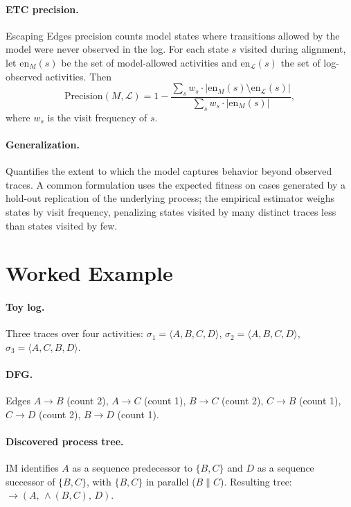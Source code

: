 \paragraph{ETC precision.} Escaping Edges precision counts model states
where transitions allowed by the model were never observed in the log.
For each state $s$ visited during alignment, let $\mathrm{en}_M(s)$ be the
set of model-allowed activities and $\mathrm{en}_{\mathcal{L}}(s)$ the
set of log-observed activities. Then
\begin{equation}
\mathrm{Precision}(M, \mathcal{L}) = 1 - \frac{\sum_s w_s \cdot
|\mathrm{en}_M(s) \setminus \mathrm{en}_{\mathcal{L}}(s)|}
{\sum_s w_s \cdot |\mathrm{en}_M(s)|},
\end{equation}
where $w_s$ is the visit frequency of $s$.

\paragraph{Generalization.} Quantifies the extent to which the model
captures behavior beyond observed traces. A common formulation uses the
expected fitness on cases generated by a hold-out replication of the
underlying process; the empirical estimator weighs states by visit
frequency, penalizing states visited by many distinct traces less than
states visited by few.


\section{Worked Example}
\label{app:C-examples}

\paragraph{Toy log.} Three traces over four activities:
$\sigma_1 = \langle A, B, C, D \rangle$,
$\sigma_2 = \langle A, B, C, D \rangle$,
$\sigma_3 = \langle A, C, B, D \rangle$.

\paragraph{DFG.} Edges $A \to B$ (count 2), $A \to C$ (count 1),
$B \to C$ (count 2), $C \to B$ (count 1), $C \to D$ (count 2),
$B \to D$ (count 1).

\paragraph{Discovered process tree.} IM identifies $A$ as a sequence
predecessor to $\{B, C\}$ and $D$ as a sequence successor of $\{B, C\}$,
with $\{B, C\}$ in parallel ($B \parallel C$). Resulting tree:
$\to(A,\, \wedge(B, C),\, D)$.

